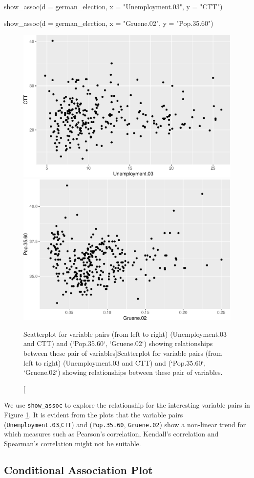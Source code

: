 \begin{Schunk}
\begin{Sinput}
show_assoc(d = german_election,
           x = "Unemployment.03",
           y = "CTT")

show_assoc(d = german_election,
           x = "Gruene.02",
           y = "Pop.35.60")
\end{Sinput}
\begin{figure}
\includegraphics[width=0.5\linewidth]{rj_paper_files/figure-latex/int-pairs-multiple-germanelection-1} \includegraphics[width=0.5\linewidth]{rj_paper_files/figure-latex/int-pairs-multiple-germanelection-2} \caption[Scatterplot for variable pairs (from left to right) (Unemployment.03 and CTT) and (`Pop.35.60`, `Gruene.02`) showing relationships between these pair of variables]{Scatterplot for variable pairs (from left to right) (Unemployment.03 and CTT) and (`Pop.35.60`, `Gruene.02`) showing relationships between these pair of variables.}\label{fig:int-pairs-multiple-germanelection}
\end{figure}
\end{Schunk}

We use \texttt{show\_assoc} to explore the relationship for the
interesting variable pairs in Figure
\ref{fig:int-pairs-multiple-germanelection}. It is evident from the
plots that the variable pairs (\texttt{Unemployment.03},\texttt{CTT})
and (\texttt{Pop.35.60}, \texttt{Gruene.02}) show a non-linear trend for
which measures such as Pearson's correlation, Kendall's correlation and
Spearman's correlation might not be suitable.

\hypertarget{conditional-association-plot}{%
\subsection{Conditional Association
Plot}\label{conditional-association-plot}}

